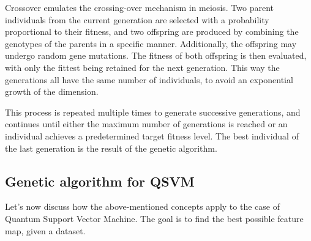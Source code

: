 \documentclass[12pt]{article}
\begin{document}
Crossover emulates the crossing-over mechanism in meiosis. Two parent individuals from the current generation are selected with a probability proportional to their fitness, and two offspring are produced by combining the genotypes of the parents in a specific manner. Additionally, the offspring may undergo random gene mutations. The fitness of both offspring is then evaluated, with only the fittest being retained for the next generation. This way the generations all have the same number of individuals, to avoid an exponential growth of the dimension. 

This process is repeated multiple times to generate successive generations, and continues until either the maximum number of generations is reached or an individual achieves a predetermined target fitness level. The best individual of the last generation is the result of the genetic algorithm. 

\subsection{Genetic algorithm for QSVM}

Let's now discuss how the above-mentioned concepts apply to the case of Quantum Support Vector Machine. The goal is to find the best possible feature map, given a dataset. 
\end{document}
